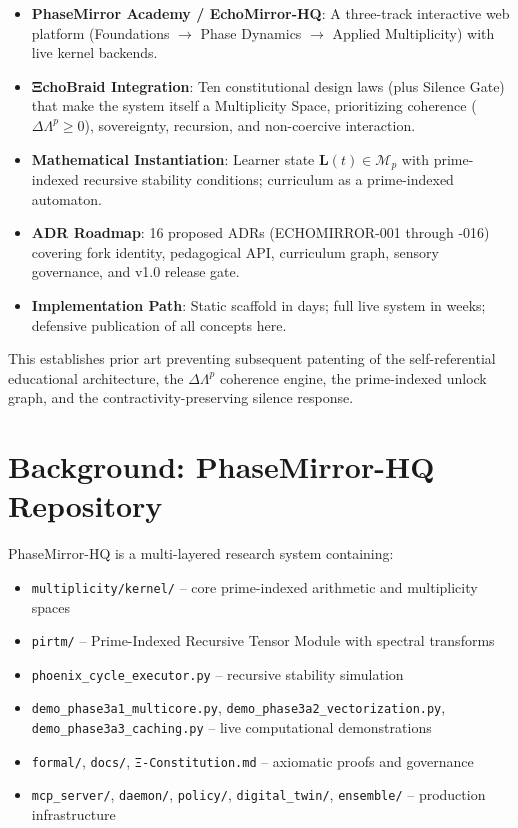 \documentclass[11pt,letterpaper]{article}
\begin{document}
\begin{itemize}[leftmargin=*]
\item \textbf{PhaseMirror Academy / EchoMirror-HQ}: A three-track interactive web platform (Foundations $\to$ Phase Dynamics $\to$ Applied Multiplicity) with live kernel backends.
\item \textbf{ΞchoBraid Integration}: Ten constitutional design laws (plus Silence Gate) that make the system itself a Multiplicity Space, prioritizing coherence ($\Delta\Lambda^p \geq 0$), sovereignty, recursion, and non-coercive interaction.
\item \textbf{Mathematical Instantiation}: Learner state $\mathbf{L}(t) \in \mathcal{M}_p$ with prime-indexed recursive stability conditions; curriculum as a prime-indexed automaton.
\item \textbf{ADR Roadmap}: 16 proposed ADRs (ECHOMIRROR-001 through -016) covering fork identity, pedagogical API, curriculum graph, sensory governance, and v1.0 release gate.
\item \textbf{Implementation Path}: Static scaffold in days; full live system in weeks; defensive publication of all concepts here.
\end{itemize}

This establishes prior art preventing subsequent patenting of the self-referential educational architecture, the $\Delta\Lambda^p$ coherence engine, the prime-indexed unlock graph, and the contractivity-preserving silence response.

\section{Background: PhaseMirror-HQ Repository}
PhaseMirror-HQ is a multi-layered research system containing:
\begin{itemize}
\item \texttt{multiplicity/kernel/} -- core prime-indexed arithmetic and multiplicity spaces
\item \texttt{pirtm/} -- Prime-Indexed Recursive Tensor Module with spectral transforms
\item \texttt{phoenix\_cycle\_executor.py} -- recursive stability simulation
\item \texttt{demo\_phase3a1\_multicore.py}, \texttt{demo\_phase3a2\_vectorization.py}, \texttt{demo\_phase3a3\_caching.py} -- live computational demonstrations
\item \texttt{formal/}, \texttt{docs/}, \texttt{Ξ-Constitution.md} -- axiomatic proofs and governance
\item \texttt{mcp\_server/}, \texttt{daemon/}, \texttt{policy/}, \texttt{digital\_twin/}, \texttt{ensemble/} -- production infrastructure
\end{itemize}
\end{document}
